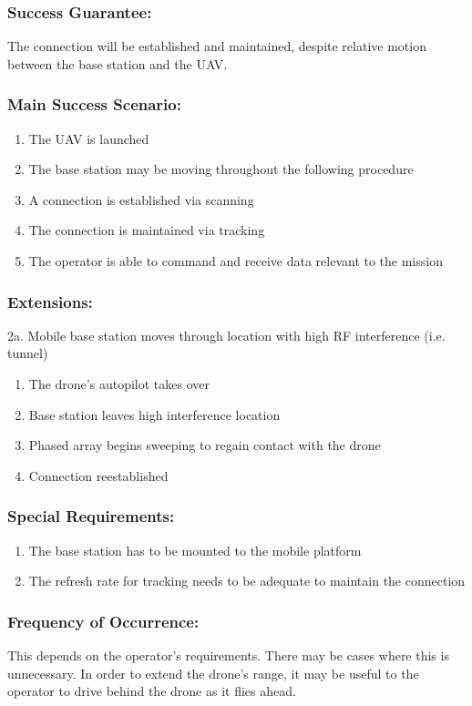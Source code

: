 \documentclass[ProductRequirements.tex]{subfiles}
\begin{document}
	\subsubsection*{Success Guarantee:}
	The connection will be established and maintained, despite relative motion between the base station and the UAV.
	\subsubsection*{Main Success Scenario:}
	\begin{enumerate}\itemsep1pt
		\item The UAV is launched
		\item The base station may be moving throughout the following procedure
		\item A connection is established via scanning
		\item The connection is maintained via tracking
		\item The operator is able to command and receive data relevant to the mission 
	\end{enumerate}
	\subsubsection*{Extensions:}
	2a. Mobile base station moves through location with high RF interference (i.e. tunnel)
	\begin{enumerate}
		\item The drone's autopilot takes over
		\item Base station leaves high interference location
		\item Phased array begins sweeping to regain contact with the drone
		\item Connection reestablished
	\end{enumerate}
	\subsubsection*{Special Requirements:}
	\begin{enumerate}\itemsep1pt
		\item The base station has to be mounted to the mobile platform
		\item The refresh rate for tracking needs to be adequate to maintain the connection
	\end{enumerate}
	\subsubsection*{Frequency of Occurrence:}
	This depends on the operator's requirements. There may be cases where this is unnecessary. In order to extend the drone's range, it may be useful to the operator to drive behind the drone as it flies ahead.
\end{document}
